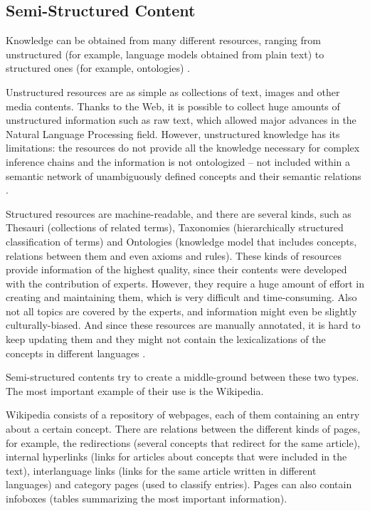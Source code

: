 \subsection{Semi-Structured Content}
Knowledge can be obtained from many different resources, ranging from unstructured (for example, language models obtained from plain text) to structured ones (for example, ontologies) \cite{hovy2013collaboratively}.

Unstructured resources are as simple as collections of text, images and other media contents. Thanks to the Web, it is possible to collect huge amounts of unstructured information such as raw text, which allowed major advances in the Natural Language Processing field. However, unstructured knowledge has its limitations: the resources do not provide all the knowledge necessary for complex inference chains \cite{domingos2007toward} and the information is not ontologized – not included within a semantic network of unambiguously defined concepts and their semantic relations \cite{hovy2013collaboratively}.

Structured resources are machine-readable, and there are several kinds, such as Thesauri (collections of related terms), Taxonomies (hierarchically structured classification of terms) and Ontologies (knowledge model that includes concepts, relations between them and even axioms and rules). These kinds of resources provide information of the highest quality, since their contents were developed with the contribution of experts. However, they require a huge amount of effort in creating and maintaining them, which is very difficult and time-consuming. Also not all topics are covered by the experts, and information might even be slightly culturally-biased. And since these resources are manually annotated, it is hard to keep updating them and they might not contain the lexicalizations of the concepts in different languages \cite{hovy2013collaboratively}.

Semi-structured contents try to create a middle-ground between these two types. The most important example of their use is the Wikipedia. 

Wikipedia consists of a repository of webpages, each of them containing an entry about a certain concept. There are relations between the different kinds of pages, for example, the redirections (several concepts that redirect for the same article), internal hyperlinks (links for articles about concepts that were included in the text), interlanguage links (links for the same article written in different languages) and category pages (used to classify entries). Pages can also contain infoboxes (tables summarizing the most important information).

